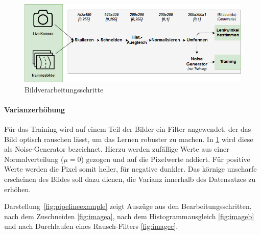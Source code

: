 \begin{figure}[h]
	\centering
	\includegraphics[scale=0.56]{figures/Pipeline.png}
	\caption{Bildverarbeitungsschritte}
	\label{fig:dronetfrozen}
\end{figure}

\paragraph{Varianzerhöhung}
Für das Training wird auf einem Teil der Bilder ein Filter angewendet, der das Bild optisch rauschen lässt, um das Lernen robuster zu machen. In \ref{fig:dronetfrozen} wird diese als Noise-Generator bezeichnet. Hierzu werden zufällige Werte aus einer Normalverteilung ($\mu = 0$) gezogen und auf die Pixelwerte addiert. Für positive Werte werden die Pixel somit heller, für negative dunkler. Das körnige unscharfe erscheinen des Bildes soll dazu dienen, die Varianz innerhalb des Datensatzes zu erhöhen.

Darstellung~\ref{fig:pipelineexample} zeigt Auszüge aus den Bearbeitungsschritten, nach dem Zuschneiden \ref{fig:imagea}, nach dem Histogrammausgleich \ref{fig:imageb} und nach Durchlaufen eines Rausch-Filters \ref{fig:imagec}.

